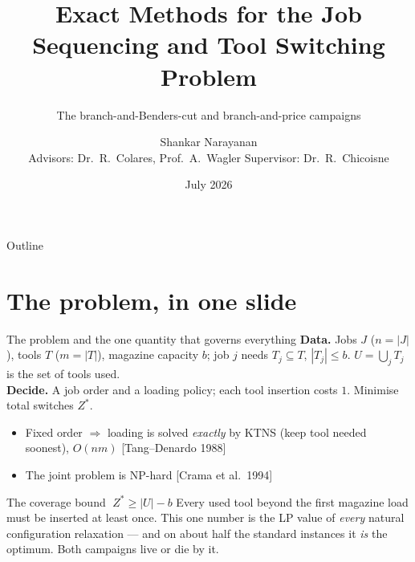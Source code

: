 \documentclass[10pt]{beamer}
\title[BBC \& BNP Campaigns]{Exact Methods for the Job Sequencing and Tool Switching Problem}
\subtitle{The branch-and-Benders-cut and branch-and-price campaigns}
\author[S.~Narayanan]{Shankar Narayanan\\[2mm]{\small Advisors: Dr.\ R.~Colares, Prof.\ A.~Wagler \quad Supervisor: Dr.\ R.~Chicoisne}}
\institute[UCA -- ISIMA -- LIMOS]{Universit\'e Clermont Auvergne \;$\cdot$\; INP ISIMA \;$\cdot$\; LIMOS}
\date{July 2026}
\newcommand{\U}{U}\newcommand{\Kst}{K^{\ast}}\newcommand{\Zst}{Z^{\ast}}
\newcommand{\cov}{\lvert\U\rvert-b}
\newcommand{\good}[1]{\textcolor{tight}{#1}}
\begin{document}
\begin{frame}\titlepage
{}
\end{frame}

\begin{frame}{Outline}\tableofcontents\end{frame}

\section{The problem, in one slide}
\begin{frame}{The problem and the one quantity that governs everything}
\textbf{Data.} Jobs $J$ ($n=|J|$), tools $T$ ($m=|T|$), magazine capacity $b$; job $j$
needs $T_j\subseteq T$, $|T_j|\le b$. $\U=\bigcup_j T_j$ is the set of tools used.\\[1mm]
\textbf{Decide.} A job order and a loading policy; each tool insertion costs $1$.
Minimise total switches $\Zst$.
\begin{itemize}
  \item Fixed order $\Rightarrow$ loading is solved \emph{exactly} by KTNS
        (keep tool needed soonest), $O(n m)$ \hfill{\footnotesize[Tang--Denardo 1988]}
  \item The joint problem is NP-hard \hfill{\footnotesize[Crama et al.\ 1994]}
\end{itemize}
\vspace{1mm}
\begin{alertblock}{The coverage bound $\;\Zst\ge\cov$}
Every used tool beyond the first magazine load must be inserted at least once. This
one number is the LP value of \emph{every} natural configuration relaxation --- and on
\good{about half} the standard instances it \emph{is} the optimum. Both campaigns live
or die by it.
\end{alertblock}
\end{frame}
\end{document}
